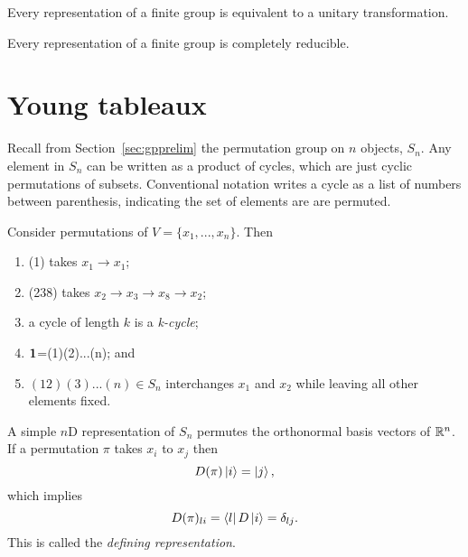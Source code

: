 \begin{theorem}{}{}
  Every representation of a finite group is equivalent to a
  unitary transformation.
\end{theorem}
\begin{theorem}{}{}
  Every representation of a finite group is completely reducible.
\end{theorem}


\section{Young tableaux}

Recall from Section~\ref{sec:gpprelim} the permutation group on
$n$ objects, $S_n$. Any element in $S_n$ can be written
as a product of cycles, which are just cyclic permutations of subsets.
Conventional notation writes a cycle as a list of numbers between
parenthesis, indicating the set of elements are are permuted.
\begin{example*}{}{}
  Consider permutations of $V=\{x_1,...,x_n\}$. Then
  \begin{enumerate}
    \item (1) takes $x_1\to x_1$;
    \item (238) takes $x_2\to x_3\to x_8\to x_2$;
    \item a cycle of length $k$ is a {\it k-cycle};
    \item ${\mathbf 1}$=(1)(2)...(n); and
    \item $(12)(3)...(n)\in S_n$ interchanges $x_1$ and $x_2$
          while leaving all other elements fixed.
  \end{enumerate}
\end{example*}
A simple $n$D representation of $S_n$ permutes the orthonormal
basis vectors of $\mathbb{R}^n$. If a permutation $\pi$ takes $x_i$
to $x_j$ then
\begin{equation}
  D(\pi)\ket{i}=\ket{j},
\end{equation}
which implies
\begin{equation}
  D(\pi)_{li}=\bra{l}D\ket{i}=\delta_{lj}.
\end{equation}
This is called the {\it defining representation}.

